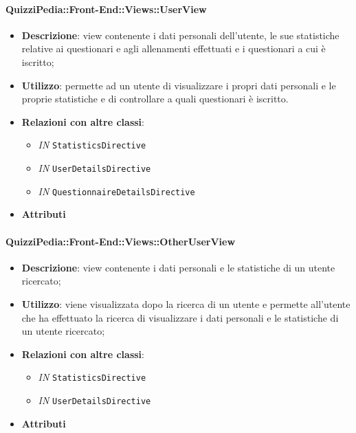 \paragraph{QuizziPedia::Front-End::Views::UserView}
\begin{itemize}
	\item \textbf{Descrizione}: view contenente i dati personali dell'utente, le sue statistiche relative ai questionari e agli allenamenti effettuati e i questionari a cui è iscritto;
	\item \textbf{Utilizzo}:  permette ad un utente di visualizzare i propri dati personali e le proprie statistiche e di controllare a quali questionari è iscritto. 
	\item \textbf{Relazioni con altre classi}:
	\begin{itemize}
		\item \textit{IN} \texttt{StatisticsDirective}
		\item \textit{IN} \texttt{UserDetailsDirective}
		\item \textit{IN} \texttt{QuestionnaireDetailsDirective}
	\end{itemize}
	\item \textbf{Attributi}
\end{itemize}

\paragraph{QuizziPedia::Front-End::Views::OtherUserView}
\begin{itemize}
	\item \textbf{Descrizione}: view contenente i dati personali e le statistiche di un utente ricercato;
	\item \textbf{Utilizzo}: viene visualizzata dopo la ricerca di un utente e permette all'utente che ha effettuato la ricerca di visualizzare i dati personali e le statistiche di un utente ricercato;
	\item \textbf{Relazioni con altre classi}:
	\begin{itemize}
		\item \textit{IN} \texttt{StatisticsDirective}
		\item \textit{IN} \texttt{UserDetailsDirective}
	\end{itemize}
	\item \textbf{Attributi}
\end{itemize}

